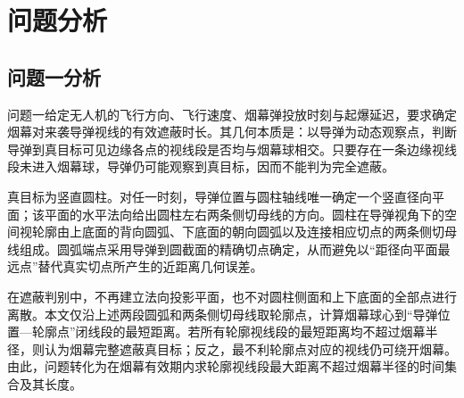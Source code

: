 \section{问题分析}

\subsection{问题一分析}

问题一给定无人机的飞行方向、飞行速度、烟幕弹投放时刻与起爆延迟，要求确定烟幕对来袭导弹视线的有效遮蔽时长。其几何本质是：以导弹为动态观察点，判断导弹到真目标可见边缘各点的视线段是否均与烟幕球相交。只要存在一条边缘视线段未进入烟幕球，导弹仍可能观察到真目标，因而不能判为完全遮蔽。

真目标为竖直圆柱。对任一时刻，导弹位置与圆柱轴线唯一确定一个竖直径向平面；该平面的水平法向给出圆柱左右两条侧切母线的方向。圆柱在导弹视角下的空间视轮廓由上底面的背向圆弧、下底面的朝向圆弧以及连接相应切点的两条侧切母线组成。圆弧端点采用导弹到圆截面的精确切点确定，从而避免以“距径向平面最远点”替代真实切点所产生的近距离几何误差。

在遮蔽判别中，不再建立法向投影平面，也不对圆柱侧面和上下底面的全部点进行离散。本文仅沿上述两段圆弧和两条侧切母线取轮廓点，计算烟幕球心到“导弹位置—轮廓点”闭线段的最短距离。若所有轮廓视线段的最短距离均不超过烟幕半径，则认为烟幕完整遮蔽真目标；反之，最不利轮廓点对应的视线仍可绕开烟幕。由此，问题转化为在烟幕有效期内求轮廓视线段最大距离不超过烟幕半径的时间集合及其长度。
